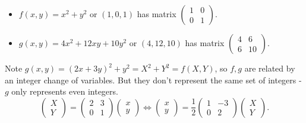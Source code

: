 \documentclass{article}
\begin{document}
\begin{eg}
    \leavevmode
    \begin{itemize}
        \item $f(x, y) = x^2 + y^2$ or $(1, 0, 1)$ has matrix
            $\begin{pmatrix}1 & 0 \\ 0 & 1\end{pmatrix}$.
        \item $g(x, y) = 4 x^2 + 12 xy + 10y^2$ or $(4, 12, 10)$ has matrix
            $\begin{pmatrix}4 & 6 \\ 6 & 10\end{pmatrix}$.
    \end{itemize}
    Note $g(x, y) = (2 x + 3 y)^2 + y^2 = X^2 + Y^2 = f(X, Y)$, so $f, g$ are related by an integer change of variables.
    But they don't represent the same set of integers - $g$ only represents even integers.
    \begin{equation*}
        \begin{pmatrix} X \\ Y \end{pmatrix}
        =
        \begin{pmatrix} 2 & 3 \\ 0 & 1 \end{pmatrix}
        \begin{pmatrix} x \\ y \end{pmatrix}
        \iff
        \begin{pmatrix} x \\ y \end{pmatrix}
        = \frac{1}{2}
        \begin{pmatrix} 1 & -3 \\ 0 & 2 \end{pmatrix}
        \begin{pmatrix} X \\ Y \end{pmatrix}.
    \end{equation*}
\end{eg}
\end{document}
